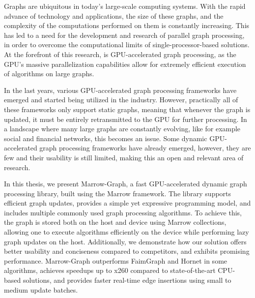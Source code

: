 
%

Graphs are ubiquitous in today's large-scale computing systems. With the rapid advance of technology and applications, the size of these graphs, and the complexity of the computations performed on them is constantly increasing. This has led to a need for the development and research of parallel graph processing, in order to overcome the computational limits of single-processor-based solutions. At the forefront of this research, is \gls{GPU}-accelerated graph processing, as the \gls{GPU}'s massive parallelization capabilities allow for extremely efficient execution of algorithms on large graphs. 

In the last years, various \gls{GPU}-accelerated graph processing frameworks have emerged and started being utilized in the industry. However, practically all of these frameworks only support static graphs, meaning that whenever the graph is updated, it must be entirely retransmitted to the \gls{GPU} for further processing. In a landscape where many large graphs are constantly evolving, like for example social and financial networks, this becomes an issue. Some dynamic \gls{GPU}-accelerated graph processing frameworks have already emerged, however, they are few and their usability is still limited, making this an open and relevant area of research.

In this thesis, we present Marrow-Graph, a fast \gls{GPU}-accelerated dynamic graph processing library, built using the Marrow framework. The library supports efficient graph updates, provides a simple yet expressive programming model, and includes multiple commonly used graph processing algorithms. To achieve this, the graph is stored both on the host and device using Marrow collections, allowing one to execute algorithms efficiently on the device while performing lazy graph updates on the host. %
%
Additionally, we demonstrate how our solution offers better usability and conciseness compared to competitors, and exhibits promising performance. Marrow-Graph outperforms FaimGraph and Hornet in some algorithms, achieves speedups up to x260 compared to state-of-the-art \gls{CPU}-based solutions, and provides faster real-time edge insertions using small to medium update batches.


